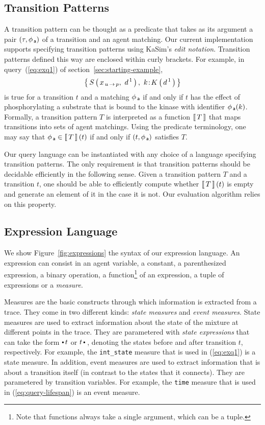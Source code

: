 \documentclass[runningheads]{llncs}
\begin{document}
\subsection{Transition Patterns}\label{subsec:tpats-language}

A transition pattern can be thought as a predicate that takes as its
argument a pair $(\tau, \phi_{\,\textsf{a}})$ of a transition and an agent
matching. Our current implementation supports specifying transition
patterns using KaSim's \emph{edit notation}. Transition patterns
defined this way are enclosed within curly brackets.  For example, in
query~(\ref{eq:exq1}) of section~\ref{sec:starting-example},
\[ \Set{ \AG{S}{x_{\Trans{u}{p}},\ d^{\,1}},\ \iAG{k}{K}{d^{\,1}} } \]
is true for a transition $t$ and a matching $\phi_{\,\textsf{a}}$ if and only
if $t$ has the effect of phosphorylating a substrate that is bound to
the kinase with identifier $\phi_{\,\textsf{a}}(k)$. Formally, a transition
pattern $T$ is interpreted as a function $\left\llbracket \, T \, \right\rrbracket$ that maps
transitions into sets of agent matchings. Using the predicate
terminology, one may say that $\phi_{\,\textsf{a}} \in \left\llbracket \, T \, \right\rrbracket(t)$ if and only
if $(t, \phi_{\,\textsf{a}})$ satisfies $T$.

Our query language can be instantiated with any choice of a language
specifying transition patterns. The only requirement is that
transition patterns should be {decidable efficiently} in the following
sense. Given a transition pattern $T$ and a transition $t$, one should
be able to efficiently compute whether $\left\llbracket \, T \, \right\rrbracket(t)$ is empty and
generate an element of it in the case it is not. Our evaluation
algorithm relies on this property.


\subsection{Expression Language}\label{subsec:expr-language}

We show Figure~\ref{fig:expressions} the syntax of our expression
language. An expression can consist in an agent variable, a constant,
a parenthesized expression, a binary operation, a
function\footnote{Note that functions always take a single argument,
  which can be a tuple.} of an expression, a tuple of expressions or a
\emph{measure}.

Measures are the basic constructs through which information is
extracted from a trace. They come in two different kinds: \emph{state
  measures} and \emph{event measures}. State measures are used to
extract information about the state of the mixture at different points
in the trace. They are parametered with \emph{state expressions} that
can take the form $\StateBefore{t}$ or $\StateAfter{t}\,$, denoting
the states before and after transition $t$, respectively. For example,
the \texttt{int\_state} measure that is used in (\ref{eq:exq1}) is a
state measure. In addition, event measures are used to extract
information that is about a transition itself (in contrast to the
states that it connects). They are parametered by transition
variables. For example, the \texttt{time} measure that is used in
(\ref{eq:query-lifespan}) is an event measure.
\end{document}
